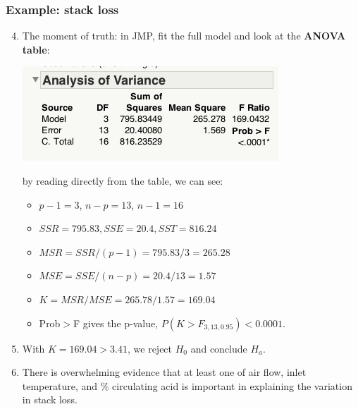 \documentclass[handout]{beamer}\usepackage[]{graphicx}\usepackage[]{color}
\numberwithin{equation}{section}
\begin{document}
\begin{frame}
\frametitle{Example: stack loss} \scriptsize
\begin{enumerate}
\setcounter{enumi}{3}
\item The moment of truth: in JMP, fit the full model and look at the {\bf ANOVA table}:
\begin{center}
 \includegraphics{../../fig/slfullanova1.png}
\end{center}
\pause by reading directly from the table, we can see: 
\begin{itemize}
\pause \item $p - 1 = 3$, $n - p = 13$, $n - 1 = 16$
\pause \item $SSR = 795.83, SSE = 20.4, SST = 816.24$
\pause \item $MSR = SSR/(p-1) = 795.83/3 = 265.28$
\pause \item $MSE = SSE/(n-p) = 20.4/13 = 1.57$
\pause \item $K = MSR/MSE = 265.78/1.57 = 169.04$
\pause \item Prob$>$F gives the p-value, $P(K > F_{3, 13, 0.95}) < 0.0001$.
\end{itemize}
\pause \item With $K = 169.04 > 3.41$, we reject $H_0$ and conclude $H_a$.
\pause \item There is overwhelming evidence that at least one of air flow, inlet temperature, and \% circulating acid is important in explaining the variation in stack loss.
\end{enumerate}
\end{frame}
\end{document}
